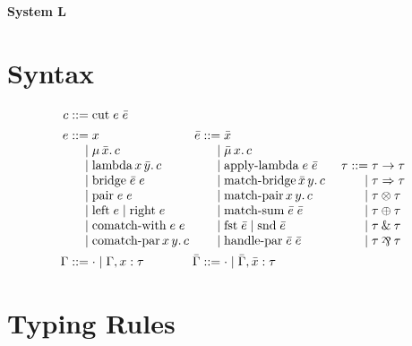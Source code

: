 \documentclass{article}
\def\with{\mathbin{\&}}
\def\parr{\mathbin{\raisebox{-0.25ex}{\rotatebox[origin=c]{180}{\&}}}}
\begin{document}
\noindent
{\huge \textbf{System L}}

\section{Syntax}

\noindent
\[\arraycolsep=1.4pt
\begin{array}{rlrlrl}
  c ::= & \text{cut}\;e\;\bar{e}
  \vspace{1ex}\\
  e ::= & x
  &
  \bar{e}
    ::= & \bar{x}
  \\
  \mid & \mu\,\bar{x}.\,c
  &
  \mid & \bar{\mu}\,x.\,c
  \\
  \mid & \text{lambda}\,x\,\bar{y}.\,c
  &
  \mid & \text{apply-lambda}\;e\;\bar{e}
  &
  \hspace{1em}
  \tau ::= & \tau \to \tau
  \\
  \mid & \text{bridge}\;\bar{e}\;e
  &
  \mid & \text{match-bridge}\,\bar{x}\,y.\,c
  &
  \mid & \tau \Rightarrow \tau
  \\
  \mid & \text{pair}\;e\;e
  &
  \mid & \text{match-pair}\,x\,y.\,c
  &
  \mid & \tau \otimes \tau
  \\
  \mid & \text{left}\;e \mid \text{right}\;e
  &
  \mid & \text{match-sum}\;\bar{e}\;\bar{e}
  &
  \mid & \tau \oplus \tau
  \\
  \mid & \text{comatch-with}\;e\;e
  &
  \mid & \text{fst}\;\bar{e} \mid \text{snd}\;\bar{e}
  &
  \mid & \tau \with \tau
  \\
  \mid & \text{comatch-par}\,x\,y.\,c
  &
  \mid & \text{handle-par}\;\bar{e}\;\bar{e}
  &
  \mid & \tau \parr \tau
  \vspace{1ex}\\
  \Gamma ::= & \cdot
          \mid \Gamma, x : \tau
  &
  \bar{\Gamma}
         ::= & \cdot
          \mid \bar{\Gamma}, \bar{x} : \tau
\end{array}
\]
\vspace{1ex}

\pagebreak

\section{Typing Rules}
\end{document}
